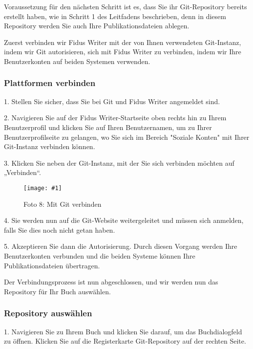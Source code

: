 \documentclass{article}
\newlength{\imgwidth}
\newcommand\scaledgraphics[2]{%
                
\settowidth{\imgwidth}{\texttt{[image: \#1]}}%
                
\setlength{\imgwidth}{\minof{\imgwidth}{#2\textwidth}}%
                
\texttt{[image: \#1]}%
                
}
\begin{document}
Voraussetzung für den nächsten Schritt ist es, dass Sie ihr Git-Repository bereits erstellt haben, wie in Schritt 1 des Leitfadens beschrieben, denn in diesem Repository werden Sie auch Ihre Publikationsdateien ablegen.


Zuerst verbinden wir Fidus Writer mit der von Ihnen verwendeten Git-Instanz, indem wir Git autorisieren, sich mit Fidus Writer zu verbinden, indem wir Ihre Benutzerkonten auf beiden Systemen verwenden.


\subsubsection{Plattformen verbinden}\label{H4178971}



1. Stellen Sie sicher, dass Sie bei Git und Fidus Writer angemeldet sind.


2. Navigieren Sie auf der Fidus Writer-Startseite oben rechts hin zu Ihrem Benutzerprofil und klicken Sie auf Ihren Benutzernamen, um zu Ihrer Benutzerprofilseite zu gelangen, wo Sie sich im Bereich "Soziale Konten" mit Ihrer Git-Instanz verbinden können.


3. Klicken Sie neben der Git-Instanz, mit der Sie sich verbinden möchten auf „Verbinden“.

\begin{figure}
\scaledgraphics{b9ca1acc-be74-4f8b-9603-368cc2bf5f3a.png}{1}
\caption*{Foto 8: Mit Git verbinden}\label{F94991061}
\end{figure}


4. Sie werden nun auf die Git-Website weitergeleitet und müssen sich anmelden, falls Sie dies noch nicht getan haben.


5. Akzeptieren Sie dann die Autorisierung. Durch diesen Vorgang werden Ihre Benutzerkonten verbunden und die beiden Systeme können Ihre Publikationsdateien übertragen.


Der Verbindungsprozess ist nun abgeschlossen, und wir werden nun das Repository für Ihr Buch auswählen.


\subsubsection{Repository auswählen}\label{H3752715}



1. Navigieren Sie zu Ihrem Buch und klicken Sie darauf, um das Buchdialogfeld zu öffnen. Klicken Sie auf die Registerkarte Git-Repository auf der rechten Seite.
\end{document}
